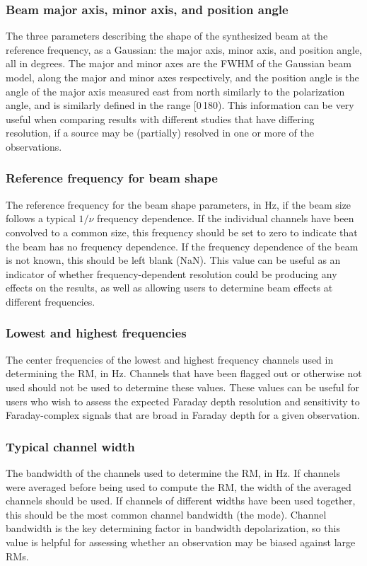 \documentclass[10pt,modern]{aastex63}
\begin{document}
\subsubsection{Beam major axis, minor axis, and position angle}
The three parameters describing the shape of the synthesized beam at the reference frequency, as a Gaussian: the major axis, minor axis, and position angle, all in degrees. The major and minor axes are the FWHM of the Gaussian beam model, along the major and minor axes respectively, and the position angle is the angle of the major axis measured east from north similarly to the polarization angle, and is similarly defined in the range [0\degr\,180\degr). This information can be very useful when comparing results with different studies that have differing resolution, if a source may be (partially) resolved in one or more of the observations.

\subsubsection{Reference frequency for beam shape}
The reference frequency for the beam shape parameters, in Hz, if the beam size follows a typical $1/\nu$ frequency dependence. If the individual channels have been convolved to a common size, this frequency should be set to zero to indicate that the beam has no frequency dependence. If the frequency dependence of the beam is not known, this should be left blank (NaN). This value can be useful as an indicator of whether frequency-dependent resolution could be producing any effects on the results, as well as allowing users to determine beam effects at different frequencies.

\subsubsection{Lowest and highest frequencies}
The center frequencies of the lowest and highest frequency channels used in determining the RM, in Hz. Channels that have been flagged out or otherwise not used should not be used to determine these values. These values can be useful for users who wish to assess the expected Faraday depth resolution and sensitivity to Faraday-complex signals that are broad in Faraday depth for a given observation.

\subsubsection{Typical channel width}
The bandwidth of the channels used to determine the RM, in Hz. If channels were averaged before being used to compute the RM, the width of the averaged channels should be used. If channels of different widths have been used together, this should be the most common channel bandwidth (the mode). Channel bandwidth is the key determining factor in bandwidth depolarization, so this value is helpful for assessing whether an observation may be biased against large RMs.
\end{document}
